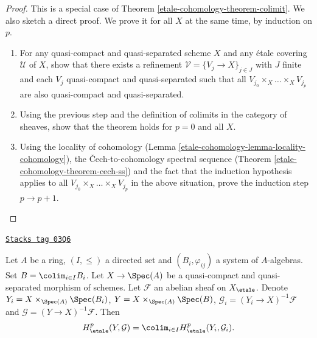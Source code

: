 \begin{proof}
This is a special case of Theorem \ref{etale-cohomology-theorem-colimit}.
We also sketch a direct proof.
We prove it for all $X$ at the same time, by induction on $p$.
\begin{enumerate}
\item
For any quasi-compact and quasi-separated scheme $X$ and any \'etale covering
$\mathcal{U}$ of $X$, show that there exists a refinement
$\mathcal{V} = \{V_j \to X\}_{j\in J}$ with $J$ finite and each $V_j$
quasi-compact and quasi-separated such that all
$V_{j_0} \times_X \ldots \times_X V_{j_p}$ are also
quasi-compact and quasi-separated.
\item
Using the previous step and the definition of colimits in the category of
sheaves, show that the theorem holds for $p = 0$ and all $X$.
\item
Using the locality of cohomology
(Lemma \ref{etale-cohomology-lemma-locality-cohomology}),
the {\v C}ech-to-cohomology spectral sequence
(Theorem \ref{etale-cohomology-theorem-cech-ss}) and the fact that the induction
hypothesis applies to all
$V_{j_0} \times_X \ldots \times_X V_{j_p}$
in the above situation, prove the induction step $p \to p + 1$.
\end{enumerate}
\end{proof}

\begin{lemma}
\label{etale-cohomology-lemma-directed-colimit-cohomology}
\href{https://stacks.math.columbia.edu/tag/03Q6}{\texttt{Stacks tag 03Q6}}

Let $A$ be a ring, $(I, \leq)$ a directed set and $(B_i, \varphi_{ij})$ a
system of $A$-algebras. Set $B = \colim_{i\in I} B_i$. Let $X \to \Spec(A)$
be a quasi-compact and quasi-separated morphism of schemes. Let
$\mathcal{F}$ an abelian sheaf on $X_\etale$.
Denote $Y_i = X \times_{\Spec(A)} \Spec(B_i)$,
$Y = X \times_{\Spec(A)} \Spec(B)$,
$\mathcal{G}_i = (Y_i \to X)^{-1}\mathcal{F}$ and
$\mathcal{G} = (Y \to X)^{-1}\mathcal{F}$. Then
$$
H_\etale^p(Y, \mathcal{G}) =
\colim_{i\in I} H_\etale^p (Y_i, \mathcal{G}_i).
$$
\end{lemma}

